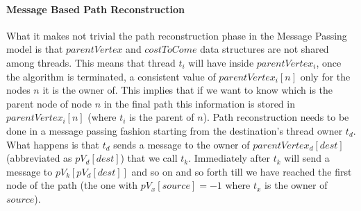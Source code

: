 \documentclass[twocolumn, switch]{article} %
\begin{document}
\paragraph{Message Based Path Reconstruction}
What it makes not trivial the path reconstruction phase in the Message Passing model
is that $parentVertex$ and $costToCome$ data structures are not shared among threads. 
This means that thread $t_i$ will have inside $parentVertex_i$, once the algorithm is terminated, 
a consistent value of $parentVertex_i[n]$ only for the nodes $n$ it is the owner of. This implies that if
we want to know which is the parent node of node $n$ in the final path this information
is stored in $parentVertex_i[n]$ (where $t_i$ is the parent of $n$). Path reconstruction needs to be done in a message passing fashion starting
from the destination's thread owner $t_d$. What happens is that $t_d$ sends a message to
the owner of $parentVertex_d[dest]$ (abbreviated as $pV_d[dest]$) that we call $t_k$. Immediately after $t_k$ will send a message
to $pV_k[pV_d[dest]]$ and so on and so forth till we have reached the first node of the path (the one with $pV_x[source] = -1$ where
$t_x$ is the owner of $source$).
\end{document}
